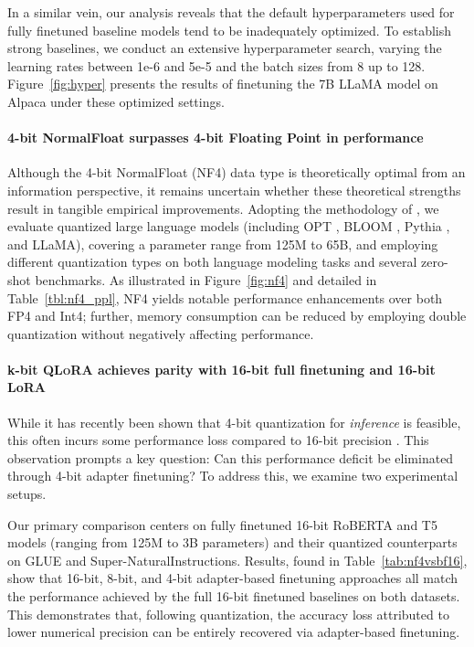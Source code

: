 In a similar vein, our analysis reveals that the default hyperparameters used for fully finetuned baseline models tend to be inadequately optimized. To establish strong baselines, we conduct an extensive hyperparameter search, varying the learning rates between 1e-6 and 5e-5 and the batch sizes from 8 up to 128. Figure~\ref{fig:hyper} presents the results of finetuning the 7B LLaMA model on Alpaca under these optimized settings.

\paragraph{4-bit NormalFloat surpasses 4-bit Floating Point in performance}

Although the 4-bit NormalFloat (NF4) data type is theoretically optimal from an information perspective, it remains uncertain whether these theoretical strengths result in tangible empirical improvements. Adopting the methodology of \citet{dettmers2022case}, we evaluate quantized large language models (including OPT \citep{zhang2022opt}, BLOOM \cite{scao2022bloom}, Pythia \cite{biderman2023pythia}, and LLaMA), covering a parameter range from 125M to 65B, and employing different quantization types on both language modeling tasks and several zero-shot benchmarks. As illustrated in Figure~\ref{fig:nf4} and detailed in Table~\ref{tbl:nf4_ppl}, NF4 yields notable performance enhancements over both FP4 and Int4; further, memory consumption can be reduced by employing double quantization without negatively affecting performance.

\paragraph{k-bit \textsc{QLoRA} achieves parity with 16-bit full finetuning and 16-bit LoRA}

While it has recently been shown that 4-bit quantization for \emph{inference} is feasible, this often incurs some performance loss compared to 16-bit precision \citep{dettmers2022case,frantar2022gptq}. This observation prompts a key question: Can this performance deficit be eliminated through 4-bit adapter finetuning? To address this, we examine two experimental setups.

Our primary comparison centers on fully finetuned 16-bit RoBERTA and T5 models (ranging from 125M to 3B parameters) and their quantized counterparts on GLUE and Super-NaturalInstructions. Results, found in Table~\ref{tab:nf4vsbf16}, show that 16-bit, 8-bit, and 4-bit adapter-based finetuning approaches all match the performance achieved by the full 16-bit finetuned baselines on both datasets. This demonstrates that, following quantization, the accuracy loss attributed to lower numerical precision can be entirely recovered via adapter-based finetuning.

